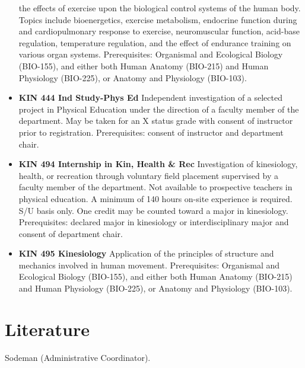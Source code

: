 \documentclass[
  letterpaper,
]{scrbook}
\begin{document}
\begin{itemize}
  the effects of exercise upon the biological control systems of the
  human body. Topics include bioenergetics, exercise metabolism,
  endocrine function during and cardiopulmonary response to exercise,
  neuromuscular function, acid-base regulation, temperature regulation,
  and the effect of endurance training on various organ systems.
  Prerequisites: Organismal and Ecological Biology (BIO-155), and either
  both Human Anatomy (BIO-215) and Human Physiology (BIO-225), or
  Anatomy and Physiology (BIO-103).
\item
  \textbf{KIN 444 Ind Study-Phys Ed} Independent investigation of a
  selected project in Physical Education under the direction of a
  faculty member of the department. May be taken for an X status grade
  with consent of instructor prior to registration. Prerequisites:
  consent of instructor and department chair.
\item
  \textbf{KIN 494 Internship in Kin, Health \& Rec} Investigation of
  kinesiology, health, or recreation through voluntary field placement
  supervised by a faculty member of the department. Not available to
  prospective teachers in physical education. A minimum of 140 hours
  on-site experience is required. S/U basis only. One credit may be
  counted toward a major in kinesiology. Prerequisites: declared major
  in kinesiology or interdisciplinary major and consent of department
  chair.
\item
  \textbf{KIN 495 Kinesiology} Application of the principles of
  structure and mechanics involved in human movement. Prerequisites:
  Organismal and Ecological Biology (BIO-155), and either both Human
  Anatomy (BIO-215) and Human Physiology (BIO-225), or Anatomy and
  Physiology (BIO-103).
\end{itemize}

\hypertarget{sec-literature}{%
\section{Literature}\label{sec-literature}}

Sodeman (Administrative Coordinator).
\end{document}
